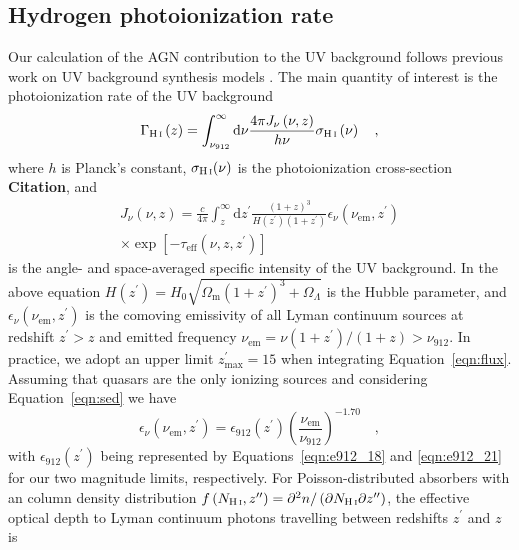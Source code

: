 \documentclass[fleqn,usenatbib]{mnras}
\begin{document}
\subsection{Hydrogen photoionization rate}
\label{sec:gammahi}

Our calculation of the AGN contribution to the UV background follows
previous work on UV background synthesis models
\citep[e.g.][]{1996ApJ...461...20H,2012ApJ...746..125H}.  The main
quantity of interest is the  photoionization rate of the UV
background
\begin{equation}
  \Gamma_\ion{H}{i}\left(z\right)=\int_{\nu_{912}}^\infty\mathrm{d}\nu
  \frac{4\pi J_\nu\left(\nu,z\right)}{h\nu} \sigma_\ion{H}{i}\left(\nu\right)\quad,
\end{equation}
where $h$ is Planck's constant, $\sigma_\ion{H}{i}(\nu)$ is the  photoionization cross-section \textbf{Citation}, and
\begin{multline}
  J_\nu(\nu, z)=\frac{c}{4\pi}\int_{z}^\infty\mathrm{d}z^\prime\frac{\left(1+z\right)^3}{H\left(z^\prime\right)\left(1+z^\prime\right)}\epsilon_\nu\left(\nu_\mathrm{em},z^\prime\right)\\
  \times\exp{\left[-\tau_\mathrm{eff}\left(\nu, z, z^\prime\right)\right]}
  \label{eqn:flux}
\end{multline}
is the angle- and space-averaged specific intensity of the UV
background. In the above equation
$H\left(z^\prime\right)=H_0\sqrt{\Omega_\mathrm{m}\left(1+z^\prime\right)^3+\Omega_\Lambda}$
is the Hubble parameter, and
$\epsilon_\nu\left(\nu_\mathrm{em},z^\prime\right)$ is the comoving
emissivity of all  Lyman continuum sources at redshift
$z^\prime>z$ and emitted frequency
$\nu_\mathrm{em}=\nu\left(1+z^\prime\right)/\left(1+z\right)>\nu_{912}$.
In practice, we adopt an upper limit $z^\prime_\mathrm{max}=15$ when
integrating Equation~\eqref{eqn:flux}.  Assuming that quasars are the
only ionizing sources and considering Equation~\eqref{eqn:sed} we have
\begin{equation}
  \epsilon_\nu\left(\nu_\mathrm{em},z^\prime\right) = \epsilon_{912}\left(z^\prime\right)\left(\frac{\nu_\mathrm{em}}{\nu_{912}}\right)^{-1.70}\quad,
  \label{eqn:epsilon_freq}
\end{equation}
with $\epsilon_{912}\left(z^\prime\right)$ being represented by Equations~\eqref{eqn:e912_18} and \eqref{eqn:e912_21} for our two magnitude limits, respectively.
For Poisson-distributed absorbers with an  column density distribution $f\left(N_\ion{H}{i},z^{\prime\prime}\right)=\partial^2n/\left(\partial N_\ion{H}{i}\partial z^{\prime\prime}\right)$, the effective optical depth to  Lyman continuum photons travelling between redshifts $z^\prime$ and $z$ is \citep{1980ApJ...240..387P} 
\end{document}
